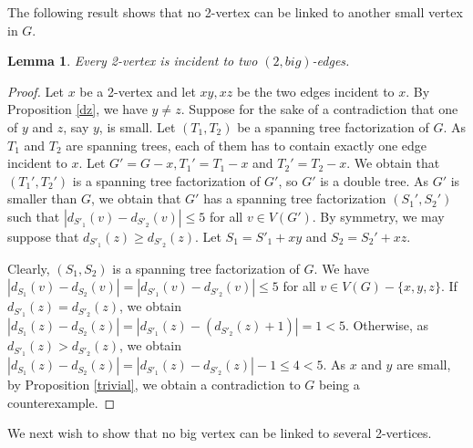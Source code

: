 \documentclass{article}
\theoremstyle{plain}
\newtheorem{Lemma}{Lemma}
\theoremstyle{nonumberplain}
\theoremstyle{nonumberplain}
\newcommand{\stf}{spanning tree factorization }
\begin{document}
 The following result shows that no 2-vertex can be linked to another small vertex in $G$.
\begin{Lemma}\label{2gross}
Every 2-vertex is incident to two $(2,big)$-edges.
\end{Lemma}
\begin{proof}
Let $x$ be a 2-vertex and let $xy,xz$ be the two edges incident to $x$. By Proposition \ref{dz}, we have $y \neq z$. Suppose for the sake of a contradiction that one of $y$ and $z$, say $y$, is small. Let $(T_1,T_2)$ be a \stf of $G$. As $T_1$ and $T_2$ are spanning trees, each of them has to contain exactly one edge incident to $x$. Let $G'=G-x, T_1'=T_1-x$  and $T_2'=T_2-x$. We obtain that $(T_1',T_2')$ is a \stf of $G'$, so $G'$ is a double tree. As $G'$ is smaller than $G$, we obtain that $G'$ has a \stf $(S_1',S_2')$ such that $|d_{S'_1}(v)-d_{S'_2}(v)|\leq 5$ for all $v \in V(G')$. By symmetry, we may suppose that $d_{S'_1}(z) \geq d_{S'_2}(z)$. Let $S_1=S'_1+xy$ and $S_2=S_2'+xz$.


 Clearly, $(S_1,S_2)$ is a \stf of $G$. We have $|d_{S_1}(v)-d_{S_2}(v)|=|d_{S'_1}(v)-d_{S'_2}(v)|\leq 5$ for all $v \in V(G)-\{x,y,z\}$. If $d_{S'_1}(z) = d_{S'_2}(z)$, we obtain $|d_{S_1}(z)-d_{S_2}(z)|=|d_{S'_1}(z)-(d_{S'_2}(z)+1)|=1 < 5$. Otherwise, as $d_{S'_1}(z) > d_{S'_2}(z)$, we obtain $|d_{S_1}(z)-d_{S_2}(z)|=|d_{S'_1}(z)-d_{S'_2}(z)|-1\leq 4 < 5$.  As $x$ and $y$ are small, by Proposition \ref{trivial}, we obtain a contradiction to $G$ being a counterexample.
\end{proof}
We next wish to show that no big vertex can be linked to several 2-vertices. %
\end{document}
